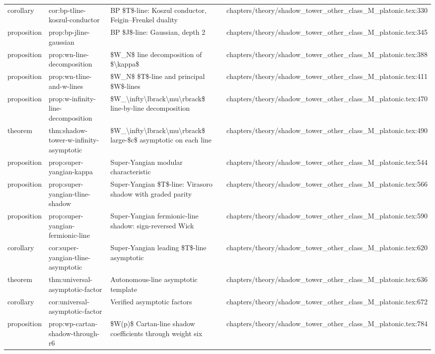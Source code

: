 \documentclass[11pt]{article}
\begin{document}
\begin{longtable}{L{0.10\textwidth}L{0.26\textwidth}L{0.42\textwidth}L{0.22\textwidth}}
corollary & cor:bp-tline-koszul-conductor & BP \$T\$-line: Koszul conductor, Feigin--Frenkel duality & chapters/theory/shadow\_tower\_other\_class\_M\_platonic.tex:330\\
proposition & prop:bp-jline-gaussian & BP \$J\$-line: Gaussian, depth 2 & chapters/theory/shadow\_tower\_other\_class\_M\_platonic.tex:345\\
proposition & prop:wn-line-decomposition & \$W\_N\$ line decomposition of \$\textbackslash{}kappa\$ & chapters/theory/shadow\_tower\_other\_class\_M\_platonic.tex:388\\
proposition & prop:wn-tline-and-w-lines & \$W\_N\$ \$T\$-line and principal \$W\$-lines & chapters/theory/shadow\_tower\_other\_class\_M\_platonic.tex:411\\
proposition & prop:w-infinity-line-decomposition & \$W\_\textbackslash{}infty\textbackslash{}lbrack\textbackslash{}mu\textbackslash{}rbrack\$ line-by-line decomposition & chapters/theory/shadow\_tower\_other\_class\_M\_platonic.tex:470\\
theorem & thm:shadow-tower-w-infinity-asymptotic & \$W\_\textbackslash{}infty\textbackslash{}lbrack\textbackslash{}mu\textbackslash{}rbrack\$ large-\$c\$ asymptotic on each line & chapters/theory/shadow\_tower\_other\_class\_M\_platonic.tex:490\\
proposition & prop:super-yangian-kappa & Super-Yangian modular characteristic & chapters/theory/shadow\_tower\_other\_class\_M\_platonic.tex:544\\
proposition & prop:super-yangian-tline-shadow & Super-Yangian \$T\$-line: Virasoro shadow with graded parity & chapters/theory/shadow\_tower\_other\_class\_M\_platonic.tex:566\\
proposition & prop:super-yangian-fermionic-line & Super-Yangian fermionic-line shadow: sign-reversed Wick & chapters/theory/shadow\_tower\_other\_class\_M\_platonic.tex:590\\
corollary & cor:super-yangian-tline-asymptotic & Super-Yangian leading \$T\$-line asymptotic & chapters/theory/shadow\_tower\_other\_class\_M\_platonic.tex:620\\
theorem & thm:universal-asymptotic-factor & Autonomous-line asymptotic template & chapters/theory/shadow\_tower\_other\_class\_M\_platonic.tex:636\\
corollary & cor:universal-asymptotic-factor & Verified asymptotic factors & chapters/theory/shadow\_tower\_other\_class\_M\_platonic.tex:672\\
proposition & prop:wp-cartan-shadow-through-r6 & \$W(p)\$ Cartan-line shadow coefficients through weight six & chapters/theory/shadow\_tower\_other\_class\_M\_platonic.tex:784\\

\end{longtable}
\end{document}

